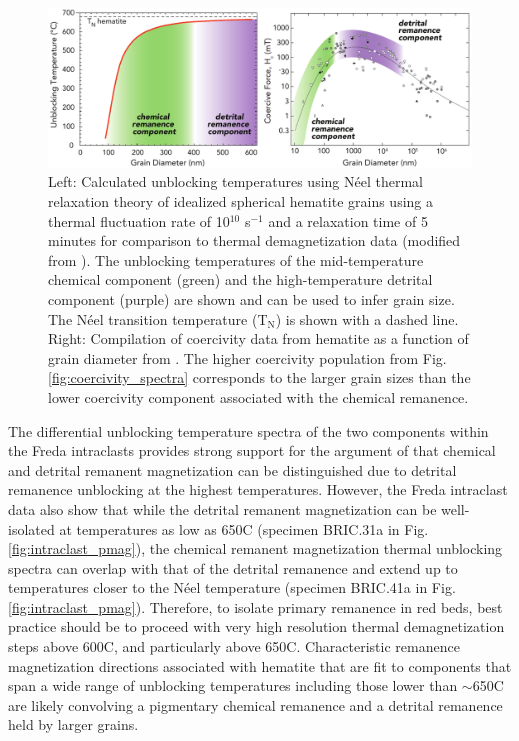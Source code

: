 \documentclass[draft]{agujournal2019}
\begin{document}
\begin{figure}[!ht]
\noindent\includegraphics[width=\textwidth]{Fig8_component_summary.pdf}
\caption{\small{Left: Calculated unblocking temperatures using N\'eel thermal relaxation theory of idealized spherical hematite grains using a thermal fluctuation rate of 10$^{10}$ s$^{-1}$ and a relaxation time of 5 minutes for comparison to thermal demagnetization data (modified from \cite{Swanson-Hysell2011a}). The unblocking temperatures of the mid-temperature chemical component (green) and the high-temperature detrital component (purple) are shown and can be used to infer grain size. The N\'eel transition temperature (T$_{\mathrm{N}}$) is shown with a dashed line. Right: Compilation of coercivity data from hematite as a function of grain diameter from \cite{Ozdemir2014a}. The higher coercivity population from Fig. \ref{fig:coercivity_spectra} corresponds to the larger grain sizes than the lower coercivity component associated with the chemical remanence.}}
\label{fig:summary}
\end{figure}

The differential unblocking temperature spectra of the two components within the Freda intraclasts provides strong support for the argument of  that chemical and detrital remanent magnetization can be distinguished due to detrital remanence unblocking at the highest temperatures. However, the Freda intraclast data also show that while the detrital remanent magnetization can be well-isolated at temperatures as low as 650\textdegree C (specimen BRIC.31a in Fig. \ref{fig:intraclast_pmag}), the chemical remanent magnetization thermal unblocking spectra can overlap with that of the detrital remanence and extend up to temperatures closer to the N\'eel temperature (specimen BRIC.41a in Fig. \ref{fig:intraclast_pmag}). Therefore, to isolate primary remanence in red beds, best practice should be to proceed with very high resolution thermal demagnetization steps above 600\textdegree C, and particularly above 650\textdegree C. Characteristic remanence magnetization directions associated with hematite that are fit to components that span a wide range of unblocking temperatures including those lower than $\sim$650\textdegree C are likely convolving a pigmentary chemical remanence and a detrital remanence held by larger grains. 
\end{document}
